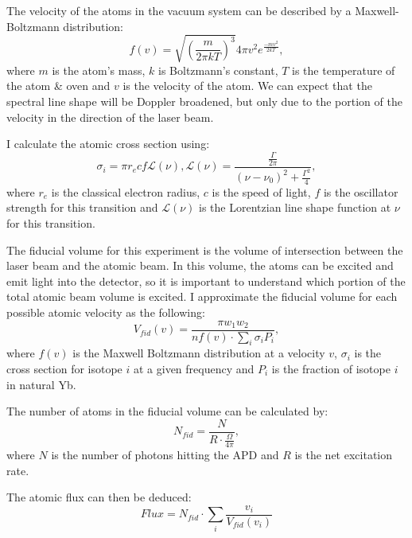 \documentclass[12pt, a4paper]{article}
\begin{document}
The velocity of the atoms in the vacuum system can be described by a Maxwell-Boltzmann distribution:
\begin{equation}
f(v) = \sqrt{(\frac{m}{2\pi k T})^3}4\pi v^2 e^{\frac{-mv^2}{2kT}},
\end{equation}
where $m$ is the atom's mass, $k$ is Boltzmann's constant, $T$ is the temperature of the atom \& oven and $v$ is the velocity of the atom. We can expect that the spectral line shape will be Doppler broadened, but only due to the portion of the velocity in the direction of the laser beam.

I calculate the atomic cross section  using:
\begin{equation}
\sigma_i = \pi r_e c f \mathscr{L}(\nu),
\mathscr{L}(\nu) = \frac{\frac{\Gamma}{2\pi}}{(\nu-\nu_0)^2+\frac{\Gamma^2}{4}},
\end{equation}
where $r_e$ is the classical electron radius, $c$ is the speed of light, $f$ is the oscillator strength for this transition and $\mathscr{L}(\nu)$ is the Lorentzian line shape function at $\nu$ for this transition.

The fiducial volume for this experiment is the volume of intersection between the laser beam and the atomic beam. In this volume, the atoms can be excited and emit light into the detector, so it is important to understand which portion of the total atomic beam volume is excited. I approximate the fiducial volume for each possible atomic velocity as the following:
\begin{equation}
V_{fid}(v) = \frac{\pi w_1 w_2}{n f(v) \cdot \sum\limits_{i} \sigma_i P_i},
\end{equation}
where $f(v)$ is the Maxwell Boltzmann distribution at a velocity $v$, $\sigma_i$ is the cross section for isotope $i$ at a given frequency and $P_i$ is the fraction of isotope $i$ in natural Yb.

The number of atoms in the fiducial volume can be calculated by:
\begin{equation}
N_{fid} = \frac{N}{R \cdot \frac{\Omega}{4\pi}},
\end{equation}
where $N$ is the number of photons hitting the APD and $R$ is the net excitation rate.

The atomic flux can then be deduced:
\begin{equation}
Flux = N_{fid}\cdot \sum\limits_i \frac{v_i}{V_{fid}(v_i)}
\end{equation}
\end{document}
